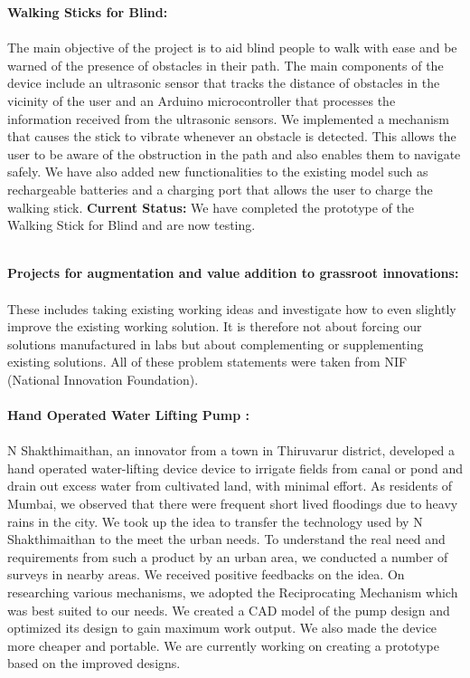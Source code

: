 \noindent\textbf{\Large Walking Sticks for Blind:}\\ \\The main objective of the project is to aid blind people to walk with ease and be warned
of the presence of obstacles in their path. The main components of the device include
an ultrasonic sensor that tracks the distance of obstacles in the vicinity of the user and
an Arduino microcontroller that processes the information received from the ultrasonic
sensors. We implemented a mechanism that causes the stick to vibrate whenever an
obstacle is detected. This allows the user to be aware of the obstruction in the path and
also enables them to navigate safely. We have also added new functionalities to the
existing model such as rechargeable batteries and a charging port that allows the user
to charge the walking stick.
\noindent \textbf{Current Status:} We have completed the prototype of the Walking Stick for Blind and
are now testing.\\ \\

\noindent \textbf{\Large  Projects for augmentation and value addition to grassroot innovations:}\\ \\These includes taking existing working ideas and investigate how to even slightly
improve the existing working solution. It is therefore not about forcing our solutions
manufactured in labs but about complementing or supplementing existing solutions. All
of these problem statements were taken from NIF (National Innovation Foundation).\\ \\

\noindent\textbf{\Large Hand Operated Water Lifting Pump :}\\ \\ N Shakthimaithan, an innovator from a town in Thiruvarur district, developed a hand
operated water-lifting device device to irrigate fields from canal or pond and drain out
excess water from cultivated land, with minimal effort.
As residents of Mumbai, we observed that there were frequent short lived floodings due
to heavy rains in the city. We took up the idea to transfer the technology used by N
Shakthimaithan to the meet the urban needs.
To understand the real need and requirements from such a product by an urban area,
we conducted a number of surveys in nearby areas. We received positive feedbacks on
the idea.
On researching various mechanisms, we adopted the Reciprocating Mechanism
which was best suited to our needs. We created a CAD model of the pump design and
optimized its design to gain maximum work output. We also made the device more
cheaper and portable.
We are currently working on creating a prototype based on the improved designs.\\

